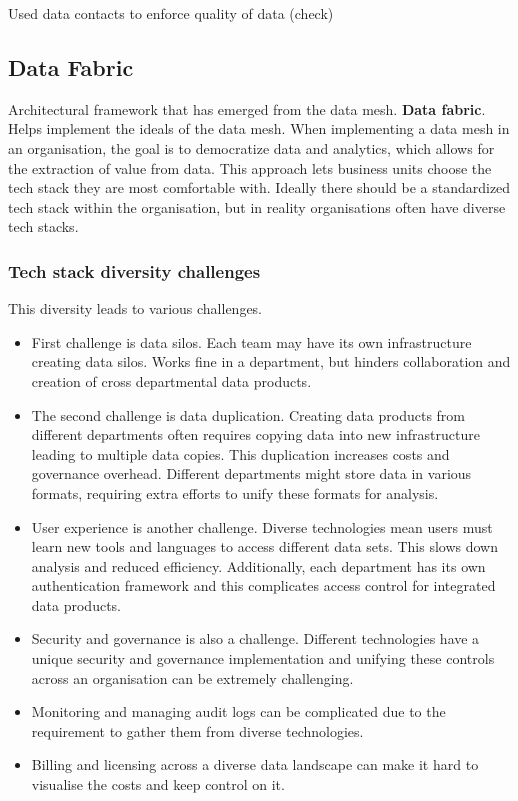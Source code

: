 \documentclass[a4paper, 11pt]{book}
\begin{document}
    Used data contacts to enforce quality of data (check)

    \subsection{Data Fabric}
    Architectural framework that has emerged from the data mesh. \textbf{Data fabric}.
    Helps implement the ideals of the data mesh.
    When implementing a data mesh in an organisation, the goal is to democratize data and analytics, which allows for the extraction of value from data.
    This approach lets business units choose the tech stack they are most comfortable with.
    Ideally there should be a standardized tech stack within the organisation, but in reality organisations often have diverse tech stacks.

    \subsubsection{Tech stack diversity challenges}
    This diversity leads to various challenges.

    \begin{itemize}
        \item First challenge is data silos. Each team may have its own infrastructure creating data silos. Works fine in a department, but hinders collaboration and creation of cross departmental data products.
        \item The second challenge is data duplication. Creating data products from different departments often requires copying data into new infrastructure leading to multiple data copies. This duplication increases costs and governance overhead. Different departments might store data in various formats, requiring extra efforts to unify these formats for analysis.
        \item User experience is another challenge. Diverse technologies mean users must learn new tools and languages to access different data sets. This slows down analysis and reduced efficiency. Additionally, each department has its own authentication framework and this complicates access control for integrated data products.
        \item Security and governance is also a challenge. Different technologies have a unique security and governance implementation and unifying these controls across an organisation can be extremely challenging.
        \item Monitoring and managing audit logs can be complicated due to the requirement to gather them from diverse technologies.
        \item Billing and licensing across a diverse data landscape can make it hard to visualise the costs and keep control on it.
    \end{itemize}
\end{document}
